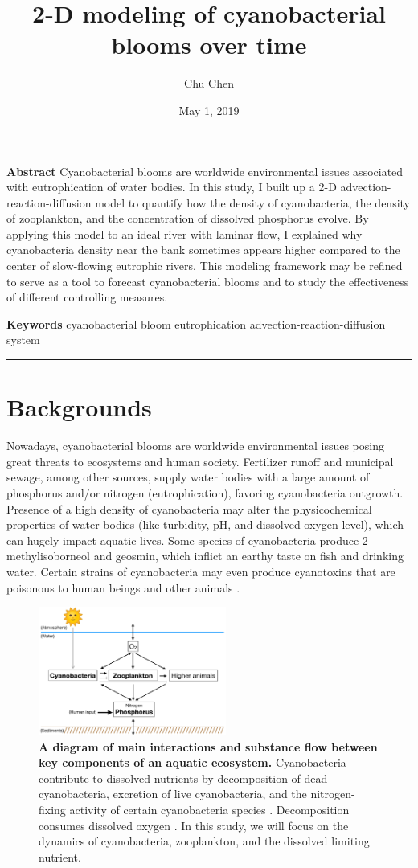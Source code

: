 \documentclass{article}
\title{2-D modeling of cyanobacterial blooms over time}
\author{Chu Chen}
\date{May 1, 2019}
\begin{document}
\maketitle

\textbf{Abstract} \quad\space Cyanobacterial blooms are worldwide environmental issues associated with eutrophication of water bodies. In this study, I built up a 2-D advection-reaction-diffusion model to quantify how the density of cyanobacteria, the density of zooplankton, and the concentration of dissolved phosphorus evolve. By applying this model to an ideal river with laminar flow, I explained why cyanobacteria density near the bank sometimes appears higher compared to the center of slow-flowing eutrophic rivers. This modeling framework may be refined to serve as a tool to forecast cyanobacterial blooms and to study the effectiveness of different controlling measures.

\textbf{Keywords} \quad cyanobacterial bloom \quad eutrophication \quad advection-reaction-diffusion system
\bigskip
\hrule

\section*{Backgrounds}
Nowadays, cyanobacterial blooms are worldwide environmental issues posing great threats to ecosystems and human society. Fertilizer runoff and municipal sewage, among other sources, supply water bodies with a large amount of phosphorus and/or nitrogen (eutrophication), favoring cyanobacteria outgrowth. Presence of a high density of cyanobacteria may alter the physicochemical properties of water bodies (like turbidity, pH, and dissolved oxygen level), which can hugely impact aquatic lives. Some species of cyanobacteria produce 2-methylisoborneol and geosmin, which inflict an earthy taste on fish and drinking water. Certain strains of cyanobacteria may even produce cyanotoxins that are poisonous to human beings and other animals \cite{GrazerSize}.

\begin{figure}[H]
    \centering
    \includegraphics[width=0.55\textwidth]{SpeciesInteraction.pdf}
    \caption{\textbf{A diagram of main interactions and substance flow between key components of an aquatic ecosystem.} Cyanobacteria contribute to dissolved nutrients by decomposition of dead cyanobacteria, excretion of live cyanobacteria, and the nitrogen-fixing activity of certain cyanobacteria species \cite{LimitingFactor}. Decomposition consumes dissolved oxygen \cite{GrazerSize}. In this study, we will focus on the dynamics of cyanobacteria, zooplankton, and the dissolved limiting nutrient.}
    \label{AquaticEcosystem}
\end{figure}
\end{document}
